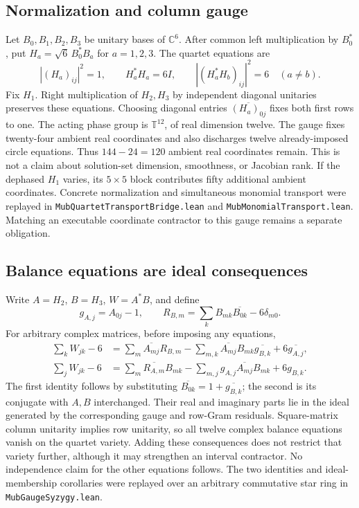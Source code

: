 \documentclass[11pt,a4paper]{article}
\theoremstyle{plain}
\theoremstyle{definition}
\begin{document}
\subsection{Normalization and column gauge}
Let $B_0,B_1,B_2,B_3$ be unitary bases of $\mathbb C^6$.
After common left multiplication by $B_0^*$, put
$H_a=\sqrt6\,B_0^*B_a$ for $a=1,2,3$.
The quartet equations are
\[
 |(H_a)_{ij}|^2=1,\qquad H_a^*H_a=6I,
 \qquad |(H_a^*H_b)_{ij}|^2=6\quad(a\ne b).
\]
Fix $H_1$. Right multiplication of $H_2,H_3$ by independent diagonal
unitaries preserves these equations. Choosing diagonal entries
$\overline{(H_a)_{0j}}$ fixes both first rows to one.
The acting phase group is $\mathbb T^{12}$, of real dimension twelve.
The gauge fixes twenty-four ambient real coordinates and also discharges
twelve already-imposed circle equations. Thus $144-24=120$ ambient real
coordinates remain. This is not a claim about solution-set dimension,
smoothness, or Jacobian rank. If the dephased $H_1$ varies, its $5\times5$
block contributes fifty additional ambient coordinates.
Concrete normalization and simultaneous monomial transport were replayed in
\texttt{MubQuartetTransportBridge.lean} and
\texttt{MubMonomialTransport.lean}. Matching an executable coordinate
contractor to this gauge remains a separate obligation.

\subsection{Balance equations are ideal consequences}
Write $A=H_2$, $B=H_3$, $W=A^*B$, and define
\[
 g_{A,j}=A_{0j}-1,\qquad
 R_{B,m}=\sum_kB_{mk}\overline{B_{0k}}-6\delta_{m0}.
\]
For arbitrary complex matrices, before imposing any equations,
\begin{align*}
 \sum_kW_{jk}-6
 &=\sum_m\overline{A_{mj}}R_{B,m}
   -\sum_{m,k}\overline{A_{mj}}B_{mk}\overline{g_{B,k}}
   +6\overline{g_{A,j}},\\
 \sum_jW_{jk}-6
 &=\sum_m\overline{R_{A,m}}B_{mk}
   -\sum_{m,j}g_{A,j}\overline{A_{mj}}B_{mk}+6g_{B,k}.
\end{align*}
The first identity follows by substituting
$\overline{B_{0k}}=1+\overline{g_{B,k}}$; the second is its conjugate
with $A,B$ interchanged. Their real and imaginary parts lie in the ideal
generated by the corresponding gauge and row-Gram residuals.
Square-matrix column unitarity implies row unitarity, so all twelve complex
balance equations vanish on the quartet variety. Adding these consequences
does not restrict that variety further, although it may strengthen an
interval contractor. No independence claim for the other equations follows.
The two identities and ideal-membership corollaries were replayed over an
arbitrary commutative star ring in \texttt{MubGaugeSyzygy.lean}.
\end{document}

